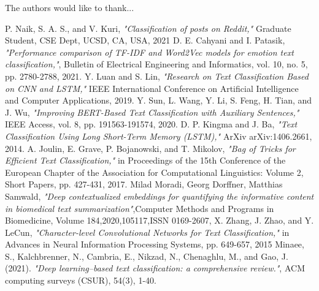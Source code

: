\documentclass[conference]{IEEEtran}
\begin{document}
The authors would like to thank...

\begin{thebibliography}{1}

P. Naik, S. A. S., and V. Kuri, \emph{"Classification of posts on Reddit,"} Graduate Student, CSE Dept, UCSD, CA, USA, 2021
D. E. Cahyani and I. Patasik, \emph{"Performance comparison of TF-IDF and Word2Vec models for emotion text classification,"}, Bulletin of Electrical Engineering and Informatics, vol. 10, no. 5, pp. 2780-2788, 2021.
Y. Luan and S. Lin, \emph{"Research on Text Classification Based on CNN and LSTM,"} IEEE International Conference on Artificial Intelligence and Computer Applications, 2019.
Y. Sun, L. Wang, Y. Li, S. Feng, H. Tian, and J. Wu, \emph{"Improving BERT-Based Text Classification with Auxiliary Sentences,"} IEEE Access, vol. 8, pp. 191563-191574, 2020.
D. P. Kingma and J. Ba, \emph{"Text Classification Using Long Short-Term Memory (LSTM),"} ArXiv arXiv:1406.2661, 2014.
A. Joulin, E. Grave, P. Bojanowski, and T. Mikolov, \emph{"Bag of Tricks for Efficient Text Classification,"} in Proceedings of the 15th Conference of the European Chapter of the Association for Computational Linguistics: Volume 2, Short Papers, pp. 427-431, 2017.
Milad Moradi, Georg Dorffner, Matthias Samwald,
\emph{"Deep contextualized embeddings for quantifying the informative content in biomedical text summarization"},Computer Methods and Programs in Biomedicine, Volume 184,2020,105117,ISSN 0169-2607,
X. Zhang, J. Zhao, and Y. LeCun, \emph{"Character-level Convolutional Networks for Text Classification,"} in Advances in Neural Information Processing Systems, pp. 649-657, 2015
Minaee, S., Kalchbrenner, N., Cambria, E., Nikzad, N., Chenaghlu, M., and  Gao, J. (2021). \emph{"Deep learning--based text classification: a comprehensive review."}, ACM computing surveys (CSUR), 54(3), 1-40.


\end{thebibliography}





\end{document}
